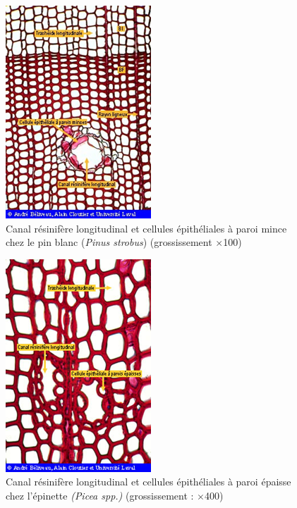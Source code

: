 \begin{figure}[h]
\centering
\includegraphics[scale=0.7]{img/epith_mince}
\caption{Canal résinifère longitudinal et cellules épithéliales à paroi mince chez le pin blanc (\textit{Pinus strobus}) (grossissement $\times$100)}
\label{fig:epth_mince}
\end{figure}


\begin{figure}[h]
\centering
\includegraphics[scale=0.7]{img/epith_epaisse}
\caption{Canal résinifère longitudinal et cellules épithéliales à paroi épaisse chez l'épinette \textit{(Picea spp.)} (grossissement : $\times$400)}
\label{fig:epth_epaisse}
\end{figure}

